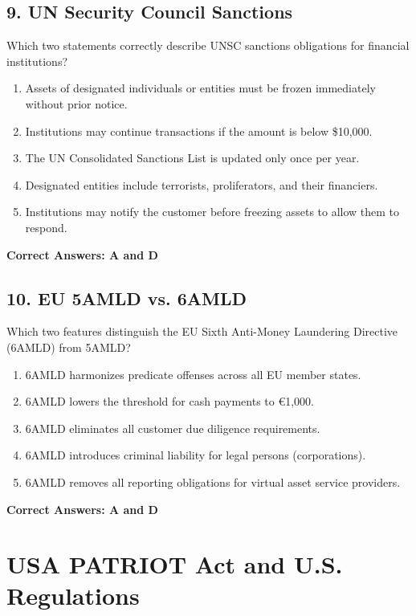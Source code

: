 \documentclass[11pt,a4paper]{article}
\begin{document}
	\subsection{9. UN Security Council Sanctions}
	Which two statements correctly describe UNSC sanctions obligations for financial institutions?
	\begin{enumerate}[label=\Alph*.]
		\item Assets of designated individuals or entities must be frozen immediately without prior notice.
		\item Institutions may continue transactions if the amount is below \$10,000.
		\item The UN Consolidated Sanctions List is updated only once per year.
		\item Designated entities include terrorists, proliferators, and their financiers.
		\item Institutions may notify the customer before freezing assets to allow them to respond.
	\end{enumerate}
	\textbf{Correct Answers: A and D}
	
	\subsection{10. EU 5AMLD vs. 6AMLD}
	Which two features distinguish the EU Sixth Anti-Money Laundering Directive (6AMLD) from 5AMLD?
	\begin{enumerate}[label=\Alph*.]
		\item 6AMLD harmonizes predicate offenses across all EU member states.
		\item 6AMLD lowers the threshold for cash payments to €1,000.
		\item 6AMLD eliminates all customer due diligence requirements.
		\item 6AMLD introduces criminal liability for legal persons (corporations).
		\item 6AMLD removes all reporting obligations for virtual asset service providers.
	\end{enumerate}
	\textbf{Correct Answers: A and D}
	
	\section{USA PATRIOT Act and U.S. Regulations}
	
\end{document}
